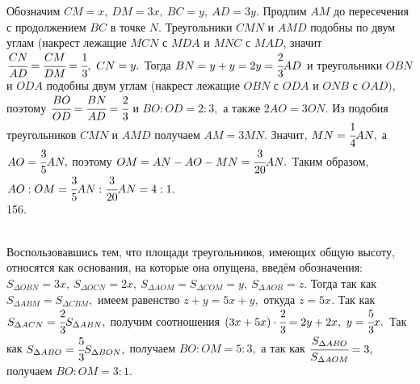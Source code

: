 \documentclass[12pt]{article}
\begin{document}
Обозначим $CM=x,\ DM=3x,\ BC=y,\ AD=3y.$ Продлим $AM$ до пересечения с продолжением $BC$ в точке $N.$ Треугольники $CMN$ и $AMD$ подобны по двум углам (накрест лежащие  $MCN$ с $MDA$ и $MNC$ с $MAD$, значит $\cfrac{CN}{AD}=\cfrac{CM}{DM}=\cfrac{1}{3},\ CN=y.$ Тогда $BN=y+y=2y=\cfrac{2}{3}AD$ и треугольники $OBN$ и $ODA$ подобны двум углам (накрест лежащие $OBN$ с $ODA$ и $ONB$ с $OAD),$ поэтому $\cfrac{BO}{OD}=\cfrac{BN}{AD}=\cfrac{2}{3}$ и $BO:OD=2:3,$ а также $2AO=3ON.$ Из подобия треугольников $CMN$ и $AMD$ получаем $AM=3MN.$ Значит, $MN=\cfrac{1}{4}AN,$ а $AO=\cfrac{3}{5}AN,$ поэтому $OM=AN-AO-MN=\cfrac{3}{20}AN.$ Таким образом, $AO:OM=\cfrac{3}{5}AN:\cfrac{3}{20}AN=4:1.$\\
156. \begin{figure}[ht!]
\end{figure}\\
Воспользовавшись тем, что площади треугольников, имеющих общую высоту, относятся как основания, на которые она опущена, введём обозначения: $S_{\Delta OBN}=3x,\ S_{\Delta OCN}=2x,\ S_{\Delta AOM}=S_{\Delta COM}=y,\ S_{\Delta AOB}=z.$ Тогда так как $S_{\Delta ABM}=S_{\Delta CBM},$ имеем равенство $z+y=5x+y,$ откуда $z=5x.$ Так как $S_{\Delta ACN}=\cfrac{2}{3}S_{\Delta ABN},$ получим соотношения $(3x+5x)\cdot\cfrac{2}{3}=2y+2x,\ y=\cfrac{5}{3}x.$ Так как $S_{\Delta ABO}=\cfrac{5}{3}S_{\Delta BON},$ получаем $BO:OM=5:3,$ а так как $\cfrac{S_{\Delta ABO}}{S_{\Delta AOM}}=3,$ получаем $BO:OM=3:1.$\\
\end{document}
